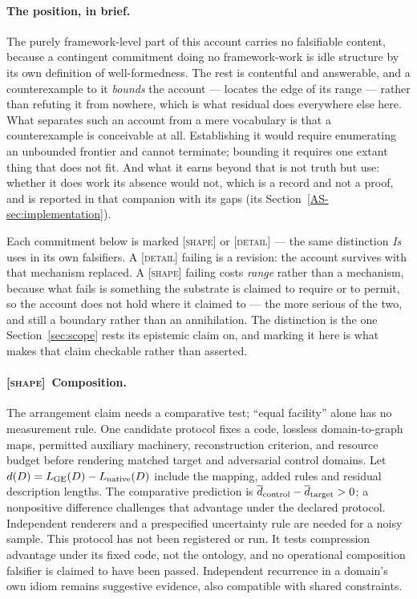 \documentclass[11pt,a4paper]{article}
\theoremstyle{remark}\newtheorem{remark}[definition]{Remark}
\begin{document}
\paragraph{The position, in brief.} The purely framework-level part of
this account carries no falsifiable content, because a contingent commitment doing no framework-work is
idle structure by its own definition of well-formedness. The rest is contentful and answerable, and a
counterexample to it \emph{bounds} the account --- locates the edge of its range --- rather than
refuting it from nowhere, which is what residual does everywhere else here. What separates such an
account from a mere vocabulary is that a counterexample is conceivable at all. Establishing it would
require enumerating an unbounded frontier and cannot terminate; bounding it requires one extant thing
that does not fit. And what it earns beyond that is not truth but use: whether it does work its absence
would not, which is a record and not a proof, and is reported in that companion with its gaps
(its Section~\ref{AS-sec:implementation}).

\medskip
Each commitment below is marked \textsc{[shape]} or \textsc{[detail]} --- the same distinction
\emph{Is} uses in its own falsifiers. A \textsc{[detail]} failing is a revision: the account survives
with that mechanism replaced. A \textsc{[shape]} failing costs \emph{range} rather than a mechanism,
because what fails is something the substrate is claimed to require or to permit, so the account does
not hold where it claimed to --- the more serious of the two, and still a boundary rather than an
annihilation. The distinction is the one Section~\ref{sec:scope} rests its epistemic claim on, and marking it here is
what makes that claim checkable rather than asserted.

\paragraph{\textnormal{\textsc{[shape]}}~Composition.}
The arrangement claim needs a comparative test; ``equal facility'' alone has no
measurement rule. One candidate protocol fixes a code, lossless domain-to-graph
maps, permitted auxiliary machinery, reconstruction criterion, and resource
budget before rendering matched target and adversarial control domains. Let
$d(D)=L_{\rm GE}(D)-L_{\rm native}(D)$ include the mapping, added rules and
residual description lengths. The comparative prediction is
$\overline d_{\rm control}-\overline d_{\rm target}>0$; a nonpositive
difference challenges that advantage under the declared protocol.
Independent renderers and a prespecified uncertainty rule are needed for a noisy
sample. This protocol has not been registered or run. It tests compression
advantage under its fixed code, not the ontology, and no operational composition
falsifier is claimed to have been passed. Independent recurrence in a domain's
own idiom remains suggestive evidence, also compatible with shared constraints.
\end{document}
